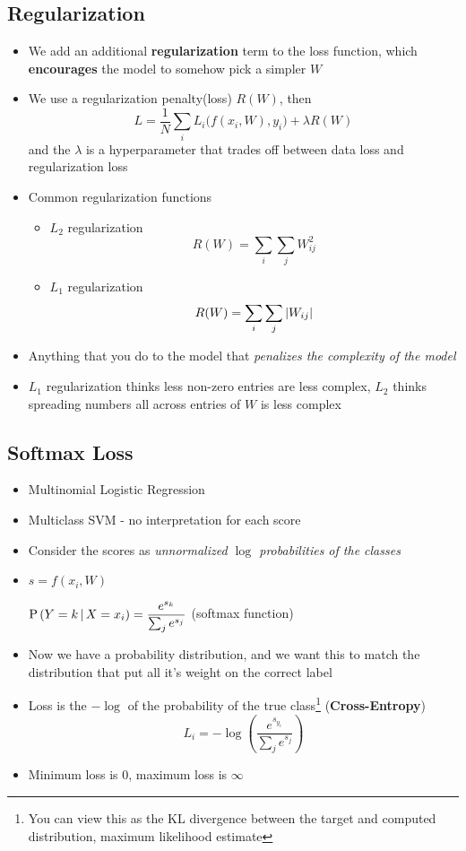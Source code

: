 \subsection{Regularization}
\begin{itemize}
	\item We add an additional \textbf{regularization} term to the loss function, which \textbf{encourages} the model to somehow pick a simpler $W$
	\item We use a regularization penalty(loss) $R(W)$, then
	$$L = \frac{1}{N} \sum_{i} L_i\big(f(x_i, W), y_i\big) + \lambda R(W)$$
	and the $\lambda$ is a hyperparameter that trades off between data loss and regularization loss
	\item Common regularization functions
	\begin{itemize}
		\item $L_2$ regularization
		$$R(W) = \sum_{i}\sum_j W_{ij}^2$$
		\item $L_1$ regularization
		$$R(W) = \sum_i \sum_j \left|W_{ij}\right|$$
	\end{itemize}
	\item Anything that you do to the model that \textit{penalizes the complexity of the model}
	\item $L_1$ regularization thinks less non-zero entries are less complex, $L_2$ thinks spreading numbers all across entries of $W$ is less complex
\end{itemize}

\subsection{Softmax Loss}
\begin{itemize}
	\item Multinomial Logistic Regression
	\item Multiclass SVM - no interpretation for each score
	\item Consider the scores as \textit{unnormalized $\log$ probabilities of the classes}
	\item $s = f(x_i, W)$
	\begin{center}
		$\displaystyle \mathrm{P}\left(Y=k \,|\, X = x_i\right) = \frac{e^{s_k}}{\sum_j e^{s_j}}$ \quad (softmax function)
	\end{center}
	\item Now we have a probability distribution, and we want this to match the distribution that put all it's weight on the correct label
	\item Loss is the $-\log$ of the probability of the true class\footnote{You can view this as the KL divergence between the target and computed distribution, maximum likelihood estimate} (\textbf{Cross-Entropy})
	$$L_i = -\log \left(\frac{e^{s_{y_i}}}{\sum_j e^{s_j}}\right)$$
	\item Minimum loss is 0, maximum loss is $\infty$	
\end{itemize}

